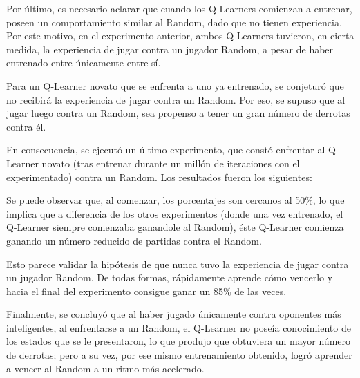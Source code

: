 Por último, es necesario aclarar que cuando los Q-Learners comienzan a entrenar, poseen un comportamiento similar al Random, dado que no tienen experiencia. Por este motivo, en el experimento anterior, ambos Q-Learners tuvieron, en cierta medida, la experiencia de jugar contra un jugador Random, a pesar de haber entrenado entre únicamente entre sí.

Para un Q-Learner novato que se enfrenta a uno ya entrenado, se conjeturó que no recibirá la experiencia de jugar contra un Random. Por eso, se supuso que al jugar luego contra un Random, sea propenso a tener un gran número de derrotas contra él.

En consecuencia, se ejecutó un último experimento, que constó enfrentar al Q-Learner novato (tras entrenar durante un millón de iteraciones con el experimentado) contra un Random. Los resultados fueron los siguientes:


Se puede observar que, al comenzar, los porcentajes son cercanos al 50\%, lo que implica que a diferencia de los otros experimentos (donde una vez entrenado, el Q-Learner siempre comenzaba ganandole al Random), éste Q-Learner comienza ganando un número reducido de partidas contra el Random.

Esto parece validar la hipótesis de que nunca tuvo la experiencia de jugar contra un jugador Random. De todas formas, rápidamente aprende cómo vencerlo y hacia el final del experimento consigue ganar un 85\% de las veces.

Finalmente, se concluyó que al haber jugado únicamente contra oponentes más inteligentes, al enfrentarse a un Random, el Q-Learner no poseía conocimiento de los estados que se le presentaron, lo que produjo que obtuviera un mayor número de derrotas; pero a su vez, por ese mismo entrenamiento obtenido, logró aprender a vencer al Random a un ritmo más acelerado.
